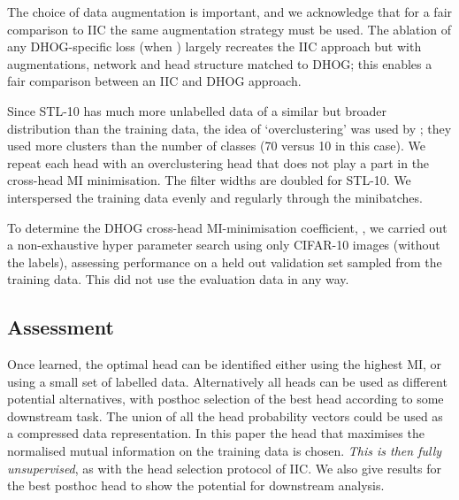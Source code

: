 \documentclass[runningheads]{llncs}
\begin{document}
The choice of data augmentation is important, and we acknowledge that for a fair comparison to IIC the same augmentation strategy must be used. The ablation of any DHOG-specific loss (when ) largely recreates the IIC approach but with augmentations, network and head structure matched to DHOG; this enables a fair comparison between an IIC and DHOG approach. 

Since STL-10 has much more unlabelled data of a similar but broader distribution than the training data, the idea of `overclustering' was used by \cite{ji2019invariant}; they used more clusters than the number of classes (70 versus 10 in this case). We repeat each head with an overclustering head that does not play a part in the cross-head MI minimisation. The filter widths are doubled for STL-10. We interspersed the training data evenly and regularly through the minibatches.








To determine the DHOG cross-head MI-minimisation coefficient, , we carried out a non-exhaustive hyper parameter search using only CIFAR-10 images (without the labels), assessing performance on a held out validation set sampled from the training data. This did not use the evaluation data in any way.

\subsection{Assessment}

Once learned, the optimal head can be identified either using the highest MI, or using a small set of labelled data. Alternatively all heads can be used as different potential alternatives, with posthoc selection of the best head according to some downstream task. The union of all the head probability vectors could be used as a compressed data representation. In this paper the head that maximises the normalised mutual information on the training data is chosen. \emph{This is then fully unsupervised}, as with the head selection protocol of IIC. We also give results for the best posthoc head to show the potential for downstream analysis.\vspace{-1mm}
\end{document}
